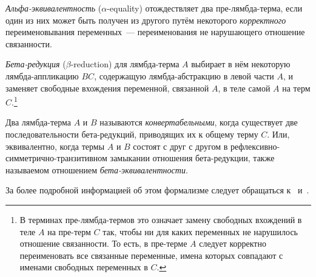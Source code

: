 \emph{Альфа-эквивалентность} ($\alpha$-equality) отождествляет два пре-лямбда-терма, если один из них может быть получен из другого путём некоторого \emph{корректного} переименовывания переменных~--- переименования не нарушающего отношение связанности.

\emph{Бета-редукция} ($\beta$-reduction) для лямбда-терма $A$ выбирает в нём некоторую лямбда-аппликацию $B C$, содержащую лямбда-абстракцию в левой части $A$, и заменяет свободные вхождения переменной, связанной $A$, в теле самой $A$ на терм $C$.\footnote{В терминах пре-лямбда-термов это означает замену свободных вхождений в теле $A$ на пре-терм $C$ так, чтобы ни для каких переменных не нарушилось отношение связанности. То есть, в пре-терме $A$ следует корректно переименовать все связанные переменные, имена которых совпадают с именами свободных переменных в $C$.}

Два лямбда-терма $A$ и $B$ называются \emph{конвертабельными},
когда существует две последовательности бета-редукций, приводящих их к общему терму $C$.
Или, эквивалентно, когда термы $A$ и $B$ состоят с друг с другом в рефлексивно-симметрично-транзитивном замыкании отношения бета-редукции, также называемом отношением \emph{бета-эквивалентности}.

За более подробной информацией об этом формализме следует обращаться к~\cite{TTFP} и~\cite{Sorensen}.

